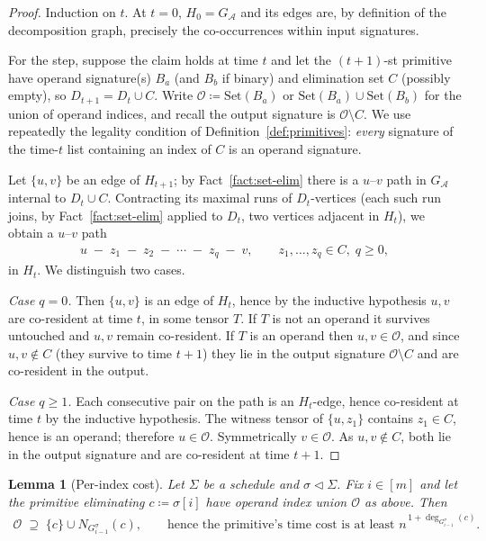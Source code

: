 \documentclass[11pt]{article}
\newcommand{\calA}{\mathcal{A}}
\newcommand{\takesetp}[1]{\mathrm{Set}(#1)}
\newcommand{\degp}[2]{\deg_{#2}(#1)}
\newcommand{\graphform}[1]{G_{#1}}
\theoremstyle{plain}
\newtheorem{lemma}{Lemma}
\theoremstyle{definition}
\theoremstyle{remark}
\begin{document}
\begin{proof}
Induction on $t$.  At $t=0$, $H_0 = \graphform{\calA}$ and its edges are,
by definition of the decomposition graph, precisely the co-occurrences
within input signatures.

For the step, suppose the claim holds at time $t$ and let the
$(t{+}1)$-st primitive have operand signature(s) $B_a$ (and $B_b$ if
binary) and elimination set $C$ (possibly empty), so
$D_{t+1} = D_t \cup C$.  Write $\mathcal{O} \coloneqq \takesetp{B_a}$ or
$\takesetp{B_a}\cup\takesetp{B_b}$ for the union of operand indices, and
recall the output signature is $\mathcal{O}\setminus C$.  We use
repeatedly the legality condition of Definition~\ref{def:primitives}:
\emph{every} signature of the time-$t$ list containing an index of $C$ is
an operand signature.

Let $\{u,v\}$ be an edge of $H_{t+1}$; by Fact~\ref{fact:set-elim} there
is a $u$--$v$ path in $\graphform{\calA}$ internal to $D_t \cup C$.
Contracting its maximal runs of $D_t$-vertices (each such run joins, by
Fact~\ref{fact:set-elim} applied to $D_t$, two vertices adjacent in
$H_t$), we obtain a $u$--$v$ path
\begin{align*}
   u \;-\; z_1 \;-\; z_2 \;-\;\cdots\;-\; z_q \;-\; v ,
   \qquad z_1,\dots,z_q \in C,\; q\ge 0,
\end{align*}
in $H_t$.  We distinguish two cases.

\emph{Case $q = 0$.}  Then $\{u,v\}$ is an edge of $H_t$, hence by the
inductive hypothesis $u,v$ are co-resident at time $t$, in some tensor
$T$.  If $T$ is not an operand it survives untouched and $u,v$ remain
co-resident.  If $T$ is an operand then $u,v \in \mathcal{O}$, and since
$u,v \notin C$ (they survive to time $t+1$) they lie in the output
signature $\mathcal{O}\setminus C$ and are co-resident in the output.

\emph{Case $q \ge 1$.}  Each consecutive pair on the path is an
$H_t$-edge, hence co-resident at time $t$ by the inductive hypothesis.
The witness tensor of $\{u,z_1\}$ contains $z_1 \in C$, hence is an
operand; therefore $u \in \mathcal{O}$.  Symmetrically
$v \in \mathcal{O}$.  As $u,v \notin C$, both lie in the output signature
and are co-resident at time $t+1$.
\end{proof}

\begin{lemma}[Per-index cost]
\label{lem:per-index}
Let $\Sigma$ be a schedule and $\sigma \vartriangleleft \Sigma$.  Fix
$i \in [m]$ and let the primitive eliminating $c \coloneqq \sigma[i]$ have
operand index union $\mathcal{O}$ as above.  Then
\begin{align*}
   \mathcal{O} \;\supseteq\; \{c\} \cup N_{G^\sigma_{i-1}}(c),
   \qquad\text{hence the primitive's time cost is at least }
   n^{\,1 + \degp{c}{G^\sigma_{i-1}}} .
\end{align*}
\end{lemma}
\end{document}
